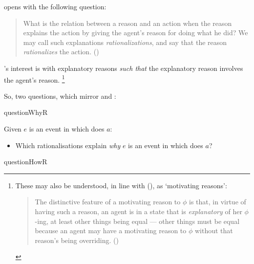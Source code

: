 \begin{note}
  \citeauthor{Davidson:1963aa} opens  with the following question:
  \begin{quote}
    What is the relation between a reason and an action when the reason explains the action by giving the agent's reason for doing what he did?
    We may call such explanations \emph{rationalizations}, and say that the reason \emph{rationalizes} the action.%
    \mbox{}\hfill\mbox{(\citeyear[685]{Davidson:1963aa})}
  \end{quote}
  \citeauthor{Davidson:1963aa}'s interest is with explanatory reasons \emph{such that} the explanatory reason involves the agent's reason.%
  \footnote{
    These may also be understood, in line with \citeauthor{Smith:1994wo} (\citeyear{Smith:1994wo}), as `motivating reasons':
    \begin{quote}
      The distinctive feature of a motivating reason to \(\phi\) is that, in virtue of having such a reason, an agent is in a state that is \emph{explanatory} of her \(\phi\)-ing, at least other things being equal --- other things must be equal because an agent may have a motivating reason to \(\phi\) without that reason's being overriding.%
      \mbox{}\hfill\mbox{(\citeyear[96]{Smith:1994wo})}
    \end{quote}
  }

  So, two questions, which mirror \qWhy{} and \qHow{}:

  \begin{question}{questionWhyR}{\qWhyR{}}
    \medskip

    Given \(e\) is an event in which \vAgent{} does \(a\):

    \begin{itemize}
    \item
      Which rationalisations explain \emph{why} \(e\) is an event in which \vAgent{} does \(a\)?
    \end{itemize}
    \vspace{-1.5\baselineskip}
  \end{question}

  \begin{question}{questionHowR}{\qHowR{}}
    \medskip


\end{question}
\end{note}
